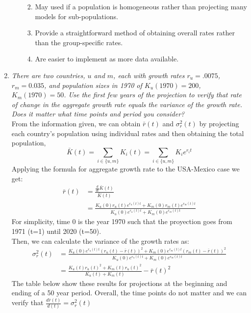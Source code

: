 \documentclass[]{book}
\providecommand{\tightlist}{%
  \setlength{\itemsep}{0pt}\setlength{\parskip}{0pt}}
\begin{document}
\begin{enumerate}
\begin{enumerate}
    \begin{enumerate}
    \def\labelenumiii{\roman{enumiii}.}
    \tightlist
    \item
      May used if a population is homogeneous rather than projecting many models for sub-populations.\\
    \item
      Provide a straightforward method of obtaining overall rates rather than the group-specific rates.
    \item
      Are easier to implement as more data available.
    \end{enumerate}
  \end{enumerate}
\item
  \emph{There are two countries, \(u\) and \(m\), each with growth rates \(r_u = .0075\), \(r_m = 0.035\), and population sizes in 1970 of \(K_u(1970) = 200\), \(K_m(1970) = 50\). Use the first few years of the projection to verify that rate of change in the aggregate growth rate equals the variance of the growth rate. Does it matter what time points and period you consider?}\\
  From the information given, we can obtain \(\bar{r}(t)\) and \(\sigma_r^2(t)\) by projecting each country's population using individual rates and then obtaining the total population, \[\bar{K}(t)= \sum_{i\in\{u,m\}}K_{i}(t) = \sum_{i\in\{u,m\}}K_{i}e^{r_{i} t}\] Applying the formula for aggregate growth rate to the USA-Mexico case we get:
  \[\begin{aligned}
   \bar{r}(t) & = \frac{\frac{d}{dt}\bar{K}(t)}{\bar{K}(t)}\\
   & = \frac{K_u(0) r_u(t) e^{r_u(t) t} + K_m(0) r_m(t) e^{r_m(t) t}}{K_u(0) e^{r_u(t) t} + K_m(0) e^{r_m (t) t}}
   \end{aligned}\] For simplicity, time 0 is the year 1970 such that the proyection goes from 1971 (t=1) until 2020 (t=50).\\
  Then, we can calculate the variance of the growth rates as:
  \[\begin{aligned}
   \sigma_r^2(t) &= \frac{{K_u(0) e^{r_u(t) t}(r_u(t) - \bar{r}(t))^2 + K_m(0) e^{r_m(t) t}(r_m(t) - \bar{r}(t))^2}} { {K_u(0) e^{r_u(t) t} + K_m(0) e^{r_m(t) t}}} \\ 
   &= \frac{K_u(t) r_u(t)^2 + K_m(t) r_u(t)^2}{K_u(t)+K_m(t)}-\bar{r}(t)^2 
   \end{aligned}\]
  The table below show these results for projections at the beginning and ending of a 50 year period. Overall, the time points do not matter and we can verify that \(\frac{d\bar{r}(t)}{d(t)}=\sigma_r^2(t)\)


\end{enumerate}
\end{document}
